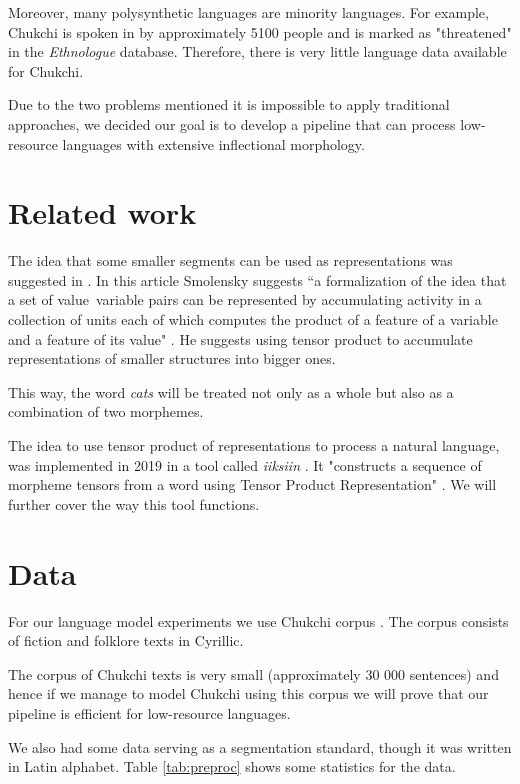 \documentclass[leqno]{article}
\begin{document}
Moreover, many polysynthetic languages are minority languages.
For example, Chukchi is spoken in by approximately 5100 people
and is marked as "threatened" in the \textit{Ethnologue}
database\parencite{ethn}.
Therefore, there is very little language data available for Chukchi.

Due to the two problems mentioned it is impossible to apply traditional approaches, we decided our goal is to develop a pipeline that can process
low-resource languages with extensive inflectional morphology.

\section{Related work}

The idea that some smaller segments can be used as representations was suggested in \parencite{tpr1990}.
In this article Smolensky suggests ``a formalization of the idea that a set of value~variable
pairs can be represented by accumulating activity in a collection of units each of which computes the
product of a feature of a variable and a feature of its value" \parencite[p. 159]{tpr1990}.
He suggests using tensor product to accumulate representations of smaller structures into
bigger ones.

This way, the word \textit{cats} will be treated not only as a whole but also as a combination
of two morphemes.

The idea to use tensor product of representations to process a natural language, was implemented in 2019 in a tool called \textit{iiksiin} \parencite{schwartz2020neural, iiksiin}.
It "constructs a sequence of morpheme tensors from a word using Tensor Product Representation"
\parencite{iiksiin}. We will further cover the way this tool functions.


\section{Data}

For our language model experiments we use Chukchi corpus
\parencite{chukchicorpus}. The corpus consists of fiction and folklore
texts in Cyrillic.

The corpus of Chukchi texts is very small (approximately 30 000 sentences)
and hence if we manage to model Chukchi using this corpus
we will prove that our pipeline is efficient for low-resource
languages.

We also had some data serving as a segmentation standard, though it was written in Latin alphabet. Table \ref{tab:preproc} shows some statistics for the data.
\end{document}
